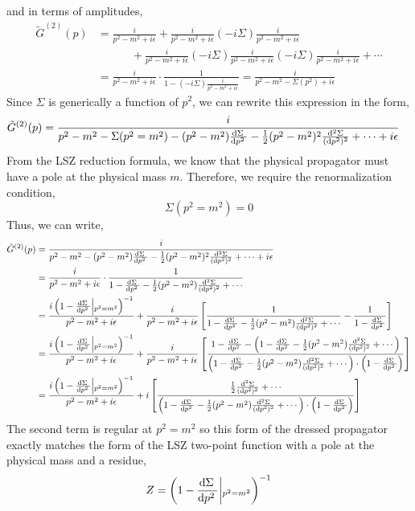 \documentclass[12pt]{extarticle}
\begin{document}
and in terms of amplitudes,
\begin{align*} 
\tilde{G}^{(2)}(p) & = \frac{i}{p^2 - m^2 + i \epsilon} + \frac{i}{p^2 - m^2 + i \epsilon} ( - i \Sigma) \frac{i}{p^2 - m^2 + i \epsilon} \\
& \quad \quad \quad +
 \frac{i}{p^2 - m^2 + i \epsilon} ( - i \Sigma) \frac{i}{p^2 - m^2 + i \epsilon}  ( - i \Sigma) \frac{i}{p^2 - m^2 + i \epsilon}  + \cdots 
\\
& = \frac{i}{p^2 - m^2 + i \epsilon} \cdot \frac{1}{1 - ( - i \Sigma) \frac{i}{p^2 - m^2 + i \epsilon}} = \frac{i}{p^2 - m^2 - \Sigma(p^2) + i \epsilon}
\end{align*}
Since $\Sigma$ is generically a function of $p^2$, we can rewrite this expression in the form,
\begin{align*}
\tilde{G}^{(2)}(p) & = \frac{i}{p^2 - m^2 - \Sigma(p^2 = m^2) - (p^2 - m^2) \frac{\mathrm{d}\Sigma \:}{\mathrm{d}p^2 \:} - \tfrac{1}{2} (p^2 - m^2)^2 \frac{\mathrm{d}^2 \Sigma}{(\mathrm{d} p^2)^2} + \cdots + i \epsilon}
\end{align*}
From the LSZ reduction formula, we know that the physical propagator must have a pole at the physical mass $m$. Therefore, we require the renormalization condition, 
\[\Sigma(p^2 = m^2) = 0\]
Thus, we can write,
\begin{align*}
\tilde{G}^{(2)}(p) & = \frac{i}{p^2 - m^2  - (p^2 - m^2) \frac{\mathrm{d}\Sigma \:}{\mathrm{d}p^2 \:} - \tfrac{1}{2} (p^2 - m^2)^2 \frac{\mathrm{d}^2 \Sigma}{(\mathrm{d} p^2)^2} + \cdots + i \epsilon}
\\
& = \frac{i}{p^2 - m^2 + i \epsilon} \cdot \frac{1}{1 - \frac{\mathrm{d}\Sigma \:}{\mathrm{d}p^2 \:} - \tfrac{1}{2} (p^2 - m^2) \frac{\mathrm{d}^2 \Sigma}{(\mathrm{d} p^2)^2} + \cdots }
\\
& = \frac{i \left(1 - \frac{\mathrm{d}\Sigma \:}{\mathrm{d}p^2 \:} \middle|_{p^2 = m^2} \right)^{-1}}{p^2 - m^2 + i \epsilon} + \frac{i}{p^2 - m^2 + i \epsilon} \left[ \frac{1}{1 - \frac{\mathrm{d}\Sigma \:}{\mathrm{d}p^2 \:} - \tfrac{1}{2} (p^2 - m^2) \frac{\mathrm{d}^2 \Sigma}{(\mathrm{d} p^2)^2} + \cdots } - \frac{1}{1 - \frac{\mathrm{d}\Sigma \:}{\mathrm{d}p^2 \:} } \right] 
\\
& = \frac{i \left(1 - \frac{\mathrm{d}\Sigma \:}{\mathrm{d}p^2 \:} \middle|_{p^2 = m^2} \right)^{-1}}{p^2 - m^2 + i \epsilon} + \frac{i}{p^2 - m^2 + i \epsilon} \left[ \frac{1 - \frac{\mathrm{d}\Sigma \:}{\mathrm{d}p^2 \:} - \left(1 - \frac{\mathrm{d}\Sigma \:}{\mathrm{d}p^2 \:} - \tfrac{1}{2} (p^2 - m^2) \frac{\mathrm{d}^2 \Sigma}{(\mathrm{d} p^2)^2} + \cdots \right)}{\left(1 - \frac{\mathrm{d}\Sigma \:}{\mathrm{d}p^2 \:} - \tfrac{1}{2} (p^2 - m^2) \frac{\mathrm{d}^2 \Sigma}{(\mathrm{d} p^2)^2} + \cdots \right) \cdot \left(1 - \frac{\mathrm{d}\Sigma \:}{\mathrm{d}p^2 \:} \right) } \right]
\\
& = \frac{i \left(1 - \frac{\mathrm{d}\Sigma \:}{\mathrm{d}p^2 \:} \middle|_{p^2 = m^2} \right)^{-1}}{p^2 - m^2 + i \epsilon} + i \left[ \frac{ \tfrac{1}{2} \frac{\mathrm{d}^2 \Sigma}{(\mathrm{d} p^2)^2} + \cdots}{\left(1 - \frac{\mathrm{d}\Sigma \:}{\mathrm{d}p^2 \:} - \tfrac{1}{2} (p^2 - m^2) \frac{\mathrm{d}^2 \Sigma}{(\mathrm{d} p^2)^2} + \cdots \right) \cdot \left(1 - \frac{\mathrm{d}\Sigma \:}{\mathrm{d}p^2 \:} \right) } \right]
\end{align*}
The second term is regular at $p^2 = m^2$ so this form of the dressed propagator exactly matches the form of the LSZ two-point function with a pole at the physical mass and a residue,
\[ Z = \left(1 - \frac{\mathrm{d}\Sigma \:}{\mathrm{d}p^2 \:} \middle|_{p^2 = m^2} \right)^{-1}\]
\end{document}
